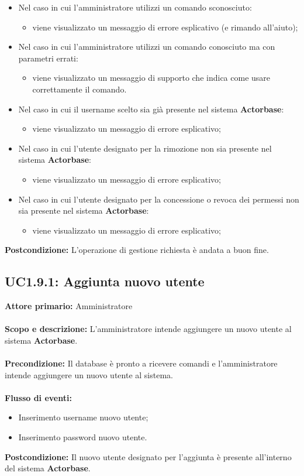 \documentclass{scalatekids-article}
\begin{document}
\begin{itemize}
\item Nel caso in cui l'amministratore utilizzi un comando sconosciuto:
  \begin{itemize}
  \item viene visualizzato un messaggio di errore esplicativo (e rimando all'aiuto);
  \end{itemize}
\item Nel caso in cui l'amministratore utilizzi un comando conosciuto ma con parametri errati:
  \begin{itemize}
  \item viene visualizzato un messaggio di supporto che indica come usare correttamente il comando.
  \end{itemize}
\item Nel caso in cui il username scelto sia già presente nel sistema \textbf{Actorbase}:
  \begin{itemize}
  \item viene visualizzato un messaggio di errore esplicativo;
  \end{itemize}
\item Nel caso in cui l'utente designato per la rimozione non sia presente nel sistema \textbf{Actorbase}:
  \begin{itemize}
  \item viene visualizzato un messaggio di errore esplicativo;
  \end{itemize}
\item Nel caso in cui l'utente designato per la concessione o revoca dei permessi non sia presente nel sistema \textbf{Actorbase}:
  \begin{itemize}
  \item viene visualizzato un messaggio di errore esplicativo;
  \end{itemize}
\end{itemize}
\textbf{Postcondizione:} L'operazione di gestione richiesta è andata a buon fine.
\subsection{UC1.9.1: Aggiunta nuovo utente}
\textbf{Attore primario:} Amministratore\\ \\
\textbf{Scopo e descrizione:} L'amministratore intende aggiungere un nuovo utente al sistema \textbf{Actorbase}.\\ \\
\textbf{Precondizione:} Il database è pronto a ricevere comandi e l'amministratore intende aggiungere un nuovo utente al sistema.\\ \\
\textbf{Flusso di eventi:}
\begin{itemize}
\item Inserimento username nuovo utente;
\item Inserimento password nuovo utente.
\end{itemize}
\textbf{Postcondizione:} Il nuovo utente designato per l'aggiunta è presente all'interno del sistema \textbf{Actorbase}.
\end{document}
